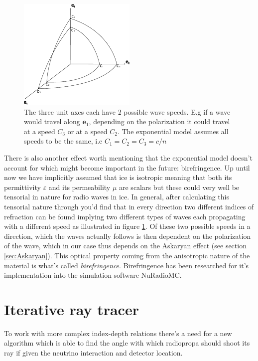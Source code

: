 \begin{figure}
  \centering
  \includegraphics[width=0.5\textwidth]{figures/Fresnel.pdf}
  \caption{The three unit axes each have 2 possible wave speeds. E.g if a wave would
  travel along $\mathbf{e}_1$, depending on the polarization it could travel at a speed $C_3$ or
  at a speed $C_2$. The exponential model assumes all speeds to be the same, i.e $C_1=C_2=C_3=c/n$}
  \label{fig:Fresnel}
\end{figure}

There is also another effect worth mentioning that the exponential model
doesn't account for which might become important in the future: birefringence.
Up until now we have implicitly assumed that ice is isotropic meaning that both
its permittivity $\varepsilon$ and its permeability $\mu$ are scalars but
these could very well be tensorial in nature for radio waves in ice. In
general, after calculating this tensorial nature through you'd find that in
every direction two different indices of refraction can be found implying two
different types of waves each propagating with a different speed as illustrated
in figure \ref{fig:Fresnel}.  Of these two possible speeds in a direction, which the waves actually
follows is then dependent on the polarization of the wave, which in our case thus depends
on the Askaryan effect (see section \ref{sec:Askaryan}).  This optical property
coming from the anisotropic nature of the material is what's called
\textit{birefringence}.  Birefringence has been researched for it's
implementation into the simulation software NuRadioMC\cite{Heyer2023}.
\newpage
\section{Iterative ray tracer}
\label{sec:Iterative}
To work with more complex index-depth relations there's a need for a
new algorithm which is able to find the angle with which radiopropa should
shoot its ray if given the neutrino interaction and detector location.

